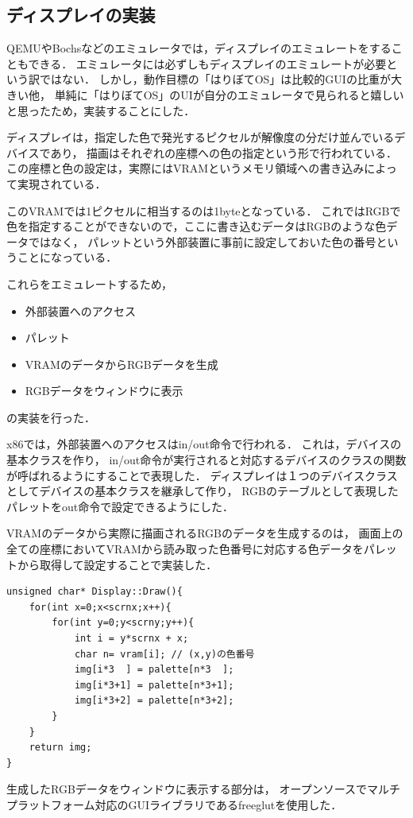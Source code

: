 \documentclass[10pt,a4j]{jsarticle}
\begin{document}
\subsection{ディスプレイの実装}
QEMUやBochsなどのエミュレータでは，ディスプレイのエミュレートをすることもできる．
エミュレータには必ずしもディスプレイのエミュレートが必要という訳ではない．
しかし，動作目標の「はりぼてOS」は比較的GUIの比重が大きい他，
単純に「はりぼてOS」のUIが自分のエミュレータで見られると嬉しいと思ったため，実装することにした．

ディスプレイは，指定した色で発光するピクセルが解像度の分だけ並んでいるデバイスであり，
描画はそれぞれの座標への色の指定という形で行われている．
この座標と色の設定は，実際にはVRAMというメモリ領域への書き込みによって実現されている．

このVRAMでは1ピクセルに相当するのは1byteとなっている．
これではRGBで色を指定することができないので，ここに書き込むデータはRGBのような色データではなく，
パレットという外部装置に事前に設定しておいた色の番号ということになっている．

これらをエミュレートするため，
\begin{itemize}
	\item 外部装置へのアクセス
	\item パレット
	\item VRAMのデータからRGBデータを生成
	\item RGBデータをウィンドウに表示
\end{itemize}
の実装を行った．

x86では，外部装置へのアクセスはin/out命令で行われる．
これは，デバイスの基本クラスを作り，
in/out命令が実行されると対応するデバイスのクラスの関数が呼ばれるようにすることで表現した．
ディスプレイは１つのデバイスクラスとしてデバイスの基本クラスを継承して作り，
RGBのテーブルとして表現したパレットをout命令で設定できるようにした．

VRAMのデータから実際に描画されるRGBのデータを生成するのは，
画面上の全ての座標においてVRAMから読み取った色番号に対応する色データをパレットから取得して設定することで実装した．

\begin{lstlisting}
unsigned char* Display::Draw(){
	for(int x=0;x<scrnx;x++){
		for(int y=0;y<scrny;y++){
			int i = y*scrnx + x;
			char n= vram[i]; // (x,y)の色番号
			img[i*3  ] = palette[n*3  ];
			img[i*3+1] = palette[n*3+1];
			img[i*3+2] = palette[n*3+2];
		}
	}
	return img;
}
\end{lstlisting}

生成したRGBデータをウィンドウに表示する部分は，
オープンソースでマルチプラットフォーム対応のGUIライブラリであるfreeglutを使用した．
\end{document}
